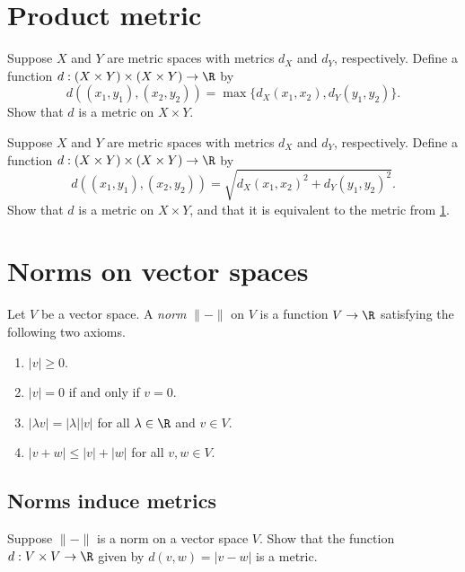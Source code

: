 

\section{Product metric} \label{product-metric}

\begin{exercise}
	Suppose $X$ and $Y$ are metric spaces with metrics $d_X$ and $d_Y$, respectively. Define a function $d : (X \times Y) \times (X \times Y) \to \R$ by 
	\[ d((x_1,y_1),(x_2,y_2)) = \max\{ d_X(x_1,x_2), d_Y(y_1,y_2) \}. \]
	Show that $d$ is a metric on $X \times Y$. 
\end{exercise}

\begin{exercise}
	Suppose $X$ and $Y$ are metric spaces with metrics $d_X$ and $d_Y$, respectively. Define a function $d : (X \times Y) \times (X \times Y) \to \R$ by 
	\[ d((x_1,y_1),(x_2,y_2)) = \sqrt{ d_X(x_1,x_2)^2 + d_Y(y_1,y_2)^2 }. \]
	Show that $d$ is a metric on $X \times Y$, and that it is equivalent to the metric from \cref{product-metric}.
\end{exercise}

\section{Norms on vector spaces}

\begin{definition} \label{norm-definition}
	Let $V$ be a vector space. A \emph{norm} $\|-\|$ on $V$ is a function $V \to \R$ satisfying the following two axioms. 
	\begin{enumerate}[(N1)]
		\item $|v| \geq 0$.
		\item $|v| = 0$ if and only if $v = 0$. 
		\item $|\lambda v| = |\lambda| |v|$ for all $\lambda \in \R$ and $v \in V$. 
		\item $|v + w| \leq |v| + |w|$ for all $v, w \in V$.
	\end{enumerate}
\end{definition}

\subsection{Norms induce metrics}

\begin{exercise} \label{norm-induces-metric}
	Suppose $\|-\|$ is a norm on a vector space $V$. Show that the function $d : V \times V \to \R$ given by $d(v, w) = |v-w|$ is a metric. 
\end{exercise}

